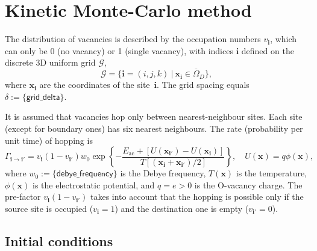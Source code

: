 \documentclass[10pt]{article}
\renewcommand{\vec}[1]{\mathbf{#1}}
\newcommand{\vi}{\vec{i}}
\newcommand{\vx}{\vec{x}}
\begin{document}


\section*{Kinetic Monte-Carlo method}

The distribution of vacancies is described by the occupation numbers $v_\vi$,
which can only be 0 (no vacancy) or 1 (single vacancy), with indices $\vi$
defined on the discrete 3D uniform grid $\mathcal{G}$,
\begin{equation}
\mathcal{G} = \{ \vi = (i, j, k) \ | \ \vx_\vi \in \overline\Omega_D \},
\end{equation}
where $\vx_\vi$ are the coordinates of the site~$\vi$. The grid spacing equals
$\delta := \{ \mathsf{grid\_delta} \}$.

It is assumed that vacancies hop only between nearest-neighbour sites. Each site
(except for boundary ones) has six nearest neighbours. The rate (probability per
unit time) of hopping is
\begin{equation}
\Gamma_{\vi \to \vi'} = v_\vi (1 - v_{\vi'}) w_0
\exp \left\{
	-\frac{E_{\mathrm{ac}} + [U(\vx_{\vi'}) - U(\vx_\vi)]}
	{T[(\vx_\vi + \vx_{\vi'}) / 2]}
\right\}, \quad U(\vx) = q \phi(\vx),
\end{equation}
where $w_0 := \{ \mathsf{debye\_frequency} \}$ is the Debye frequency, $T(\vx)$
is the temperature, $\phi(\vx)$ is the electrostatic potential, and $q = e > 0$
is the O-vacancy charge. The pre-factor $v_\vi (1 - v_{\vi'})$ takes into account
that the hopping is possible only if the source site is occupied ($v_\vi = 1$)
and the destination one is empty ($v_{\vi'} = 0$).

\subsection*{Initial conditions}
\end{document}
